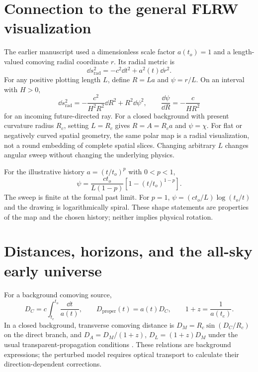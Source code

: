 \section{Connection to the general FLRW visualization}
The earlier manuscript used a dimensionless scale factor $a(t_o)=1$
and a length-valued comoving radial coordinate $r$. Its radial metric is
\begin{equation}
 \dd s_{\mathrm{rad}}^2=-c^2\dd t^2+a^2(t)\dd r^2.
\end{equation}
For any positive plotting length $L$, define $R=La$ and $\psi=r/L$.
On an interval with $H>0$,
\begin{equation}\label{eq:plotting-metric}
 \dd s_{\mathrm{rad}}^2=-\frac{c^2}{H^2R^2}\dd R^2+R^2\dd\psi^2,
 \qquad \frac{\dd\psi}{\dd R}=-\frac{c}{HR^2}
\end{equation}
for an incoming future-directed ray. For a closed background with
present curvature radius $R_c$, setting $L=R_c$ gives
$R=A=R_ca$ and $\psi=\chi$. For flat or negatively curved spatial
geometry, the same polar map is a radial visualization, not a round
embedding of complete spatial slices. Changing arbitrary $L$ changes
angular sweep without changing the underlying physics.

For the illustrative history $a=(t/t_o)^p$ with $0<p<1$,
\begin{equation}
 \psi=\frac{ct_o}{L(1-p)}\left[1-(t/t_o)^{1-p}\right].
\end{equation}
The sweep is finite at the formal past limit. For $p=1$,
$\psi=(ct_o/L)\log(t_o/t)$ and the drawing is logarithmically spiral.
These shape statements are properties of the map and the chosen
history; neither implies physical rotation.

\section{Distances, horizons, and the all-sky early universe}
For a background comoving source,
\begin{equation}
 D_C=c\int_{t_e}^{t_o}\frac{\dd t}{a(t)},\qquad
 D_{\mathrm{proper}}(t)=a(t)D_C,\qquad
 1+z=\frac{1}{a(t_e)}.
\end{equation}
In a closed background, transverse comoving distance is
$D_M=R_c\sin(D_C/R_c)$ on the direct branch, and
$D_A=D_M/(1+z)$, $D_L=(1+z)D_M$ under the usual transparent-propagation
conditions \citep{Hogg1999}. These relations are background expressions;
the perturbed model requires optical transport to calculate their
direction-dependent corrections.


